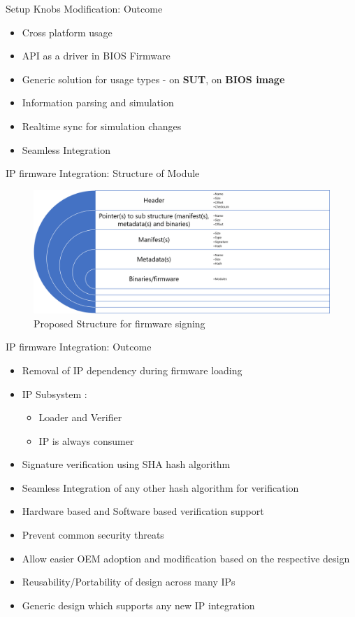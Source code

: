 \begin{frame}{Setup Knobs Modification: Outcome}
    \begin{itemize}
        \item Cross platform usage
        \item API as a driver in BIOS Firmware
        \item Generic solution for usage types - on \textbf{SUT}, on \textbf{BIOS image}
        \item Information parsing and simulation
        \item Realtime sync for simulation changes
        \item Seamless Integration
    \end{itemize}
\end{frame}


\begin{frame}{IP firmware Integration: Structure of Module}
    \begin{figure}[htbp]
        \centering
        \includegraphics[width=0.9\linewidth]{Im/figures/proposed-work/proposed-structure-firmware-signing}
        \caption{Proposed Structure for firmware signing}\label{fig:proposed-work-proposed-structure-firmware-signing}
    \end{figure}
\end{frame}


\begin{frame}{IP firmware Integration: Outcome}
    \begin{itemize}
        \item Removal of IP dependency during firmware loading
        \item IP Subsystem :
        \begin{itemize}
            \item Loader and Verifier
            \item IP is always consumer
        \end{itemize}
        \item Signature verification using SHA hash algorithm
        \item Seamless Integration of any other hash algorithm for verification
        \item Hardware based and Software based verification support
        \item Prevent common security threats
        \item Allow easier OEM adoption and modification based on the respective design
        \item Reusability/Portability of design across many IPs
        \item Generic design which supports any new IP integration
    \end{itemize}
\end{frame}